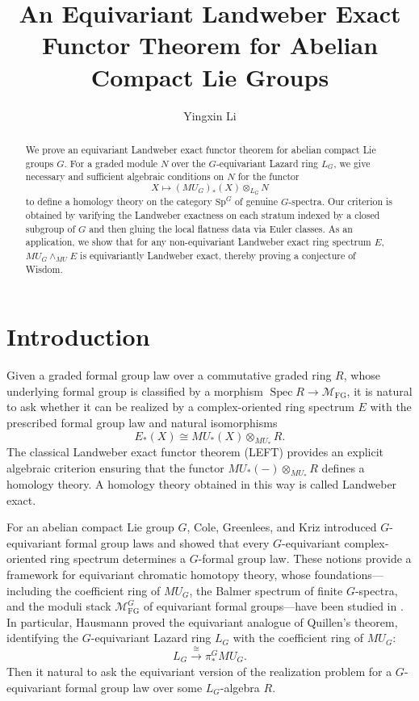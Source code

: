 \documentclass[11pt,reqno]{amsart}
\title[Equivariant Landweber exactness]{An Equivariant Landweber Exact Functor Theorem for Abelian Compact Lie Groups}
\author{Yingxin Li}
\newcommand{\Sp}{\mathrm{Sp}}
\newcommand{\Spec}{\operatorname{Spec}}
\newcommand{\MFG}{\mathcal M_{\mathrm{FG}}}
\newcommand{\tensor}{\otimes}
\begin{document}
\begin{abstract}
    We prove an equivariant Landweber exact functor theorem for abelian compact Lie groups $G$. For a graded module $N$ over the $G$-equivariant Lazard ring $L_G$, we give necessary and sufficient algebraic conditions on $N$ for the functor
    \[
    X\longmapsto (MU_G)_*(X)\otimes_{L_G} N
    \]
    to define a homology theory on the category $\Sp^G$ of genuine $G$-spectra. Our criterion is obtained by varifying the Landweber exactness on each stratum indexed by a closed subgroup of $G$ and then gluing the local flatness data via Euler classes. As an application, we show that for any non-equivariant Landweber exact ring spectrum $E$, $MU_G\wedge_{MU} E$ is equivariantly Landweber exact, thereby proving a conjecture of Wisdom.
\end{abstract}

\maketitle
\tableofcontents

\section{Introduction}
Given a graded formal group law over a commutative graded ring $R$, whose underlying formal group is classified by a morphism $\Spec R\to\MFG$, it is natural to ask whether it can be realized by a complex-oriented ring spectrum $E$ with the prescribed formal group law and natural isomorphisms
\[
E_*(X)\cong  MU_*(X)\tensor_{ MU_*}R.
\]
The classical Landweber exact functor theorem (LEFT) \cite{landweber1973associated,landweber1976homological} provides an explicit algebraic criterion ensuring that the functor $MU_*(-)\otimes_{MU_*} R$ defines a homology theory. A homology theory obtained in this way is called Landweber exact.

For an abelian compact Lie group $G$, Cole, Greenlees, and Kriz introduced $G$-equivariant formal group laws \cite{cole2000equivariant} and showed that every $G$-equivariant complex-oriented ring spectrum determines a $G$-formal group law. These notions provide a framework for equivariant chromatic homotopy theory, whose foundations---including the coefficient ring of $ MU_G$, the Balmer spectrum of finite $G$-spectra, and the moduli stack $\MFG^G$ of equivariant formal groups---have been studied in \cite{greenlees2001equivariant,cole2000equivariant,strickland2011multicurves,hanke2018equivariant,barthel2020balmer,hu2021equivariant,hausmann2022global,hausmann2023invariant,wisdom2024properties,behrens2024periodic,groenjes2026homology}.
In particular, Hausmann \cite{hausmann2022global} proved the equivariant analogue of Quillen's theorem, identifying the $G$-equivariant Lazard ring $L_G$ with the coefficient ring of $ MU_G$:
\[
L_G\xrightarrow{\;\cong\;}\pi_*^G MU_G.
\]
Then it natural to ask the equivariant version of the realization problem for a $G$-equivariant formal group law over some $L_G$-algebra $R$.
\end{document}
